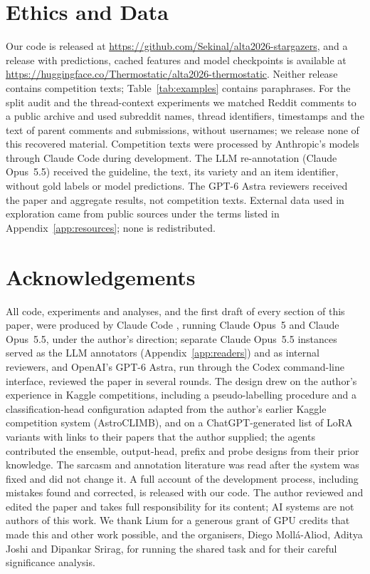 \documentclass[11pt]{article}
\begin{document}
\section*{Ethics and Data}
Our code is released at \url{https://github.com/Sekinal/alta2026-stargazers}, and a release with predictions, cached
features and model checkpoints is available at \url{https://huggingface.co/Thermostatic/alta2026-thermostatic}. Neither release
contains competition texts; Table~\ref{tab:examples} contains paraphrases. For the split audit and the thread-context experiments we
matched Reddit comments to a public archive and used subreddit names, thread identifiers, timestamps and the text of
parent comments and submissions, without usernames; we release none of this recovered material. Competition texts were processed by Anthropic's models through Claude Code during development.
The LLM re-annotation (Claude Opus~5.5) received the guideline, the text, its variety and an item identifier, without gold labels or
model predictions. The GPT-6 Astra reviewers received the paper and aggregate results, not competition texts. External
data used in exploration came from public sources under the terms listed in Appendix~\ref{app:resources}; none is
redistributed.

\section*{Acknowledgements}
All code, experiments and analyses, and the first draft of every section of this paper, were produced by Claude Code \citep{claudecode},
running Claude Opus~5 and Claude Opus~5.5, under the author's direction; separate Claude Opus~5.5 instances served as the LLM
annotators (Appendix~\ref{app:readers}) and as internal reviewers, and OpenAI's GPT-6 Astra, run through the Codex
command-line interface, reviewed the paper in several rounds. The design drew on the author's experience in Kaggle
competitions, including a pseudo-labelling procedure and a classification-head configuration adapted from the author's earlier
Kaggle competition system (AstroCLIMB), and on a ChatGPT-generated list
of LoRA variants with links to their papers that the author supplied; the agents contributed the ensemble, output-head,
prefix and probe designs from their prior knowledge. The sarcasm and annotation literature was read after the system was
fixed and did not change it. A full account of the development process, including mistakes found
and corrected, is released with our code. The author reviewed and edited the paper and takes full
responsibility for its content; AI systems are not authors of this work. We thank Lium for a generous grant of GPU
credits that made this and other work possible, and the organisers, Diego Moll\'{a}-Aliod, Aditya Joshi and Dipankar
Srirag, for running the shared task and for their careful significance analysis.
\end{document}
